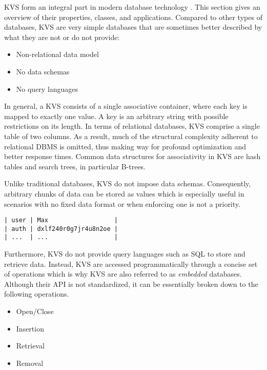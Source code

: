 \ac{KVS} form an integral part in modern database technology
\cite{fiebig2016one}. This section gives an overview of their properties,
classes, and applications. Compared to other types of databases, \ac{KVS} are
very simple databases that are sometimes better described by what they are not
or do not provide:

\begin{itemize}
    \item Non-relational data model
    \item No data schemas
    \item No query languages
\end{itemize}

In general, a \ac{KVS} consists of a single associative container, where each
key is mapped to exactly one value. A key is an arbitrary string with possible
restrictions on its length. In terms of relational databases, \ac{KVS} comprise
a single table of two columns. As a result, much of the structural complexity
adherent to relational \ac{DBMS} is omitted, thus making way for profound
optimization and better response times. Common data structures for associativity
in \ac{KVS} are hash tables and search trees, in particular B-trees.

Unlike traditional databases, \ac{KVS} do not impose data schemas. Consequently,
arbitrary chunks of data can be stored as values which is especially useful in
scenarios with no fixed data format or when enforcing one is not a priority.

\begin{lstlisting}
| user | Max                  |
| auth | dxlf240r0g7jr4u8n2oe |
| ...  | ...                  |
\end{lstlisting}

Furthermore, \ac{KVS} do not provide query languages such as SQL to store and
retrieve data. Instead, \ac{KVS} are accessed programmatically through a concise
set of operations which is why \ac{KVS} are also referred to as \emph{embedded}
databases. Although their \ac{API} is not standardized, it can be essentially
broken down to the following operations.

\begin{itemize}
    \item Open/Close
    \item Insertion
    \item Retrieval
    \item Removal
\end{itemize}

